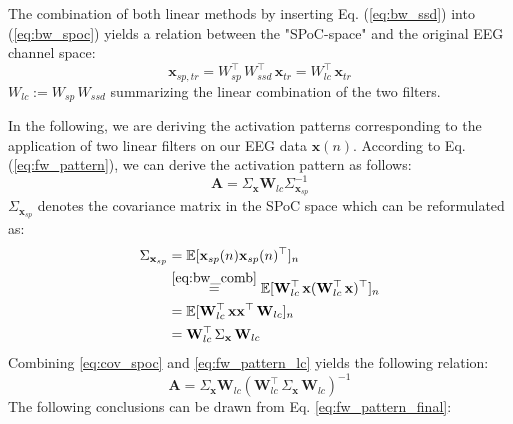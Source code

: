 \documentclass[11pt,a4paper]{article}
\renewcommand{\vec}[1]{\mathbf{#1}}
\begin{document}
The combination of both linear methods by inserting Eq. (\ref{eq:bw_ssd}) into (\ref{eq:bw_spoc}) yields a relation between the "SPoC-space" and the original EEG channel space:
\begin{equation}\label{eq:bw_comb}
\vec{x}_{sp,tr} = W_{sp}^\top \, W_{ssd}^\top \, \vec{x}_{tr} = W_{lc}^\top\, \vec{x}_{tr}
\end{equation}
$W_{lc} := W_{sp} \, W_{ssd}$ summarizing the linear combination of the two filters. 

In the following, we are deriving the activation patterns corresponding to the application of two linear filters on our EEG data $\vec{x}(n)$. According to Eq.\,(\ref{eq:fw_pattern}), we can derive the activation pattern as follows:
\begin{equation}\label{eq:fw_pattern_lc}
\vec{A} = \Sigma_{\vec{x}} \vec{W}_{lc} \Sigma_{\vec{x}_{sp}}^{-1} 
\end{equation}
$\Sigma_{\vec{x}_{sp}}$ denotes the covariance matrix in the SPoC space which can be reformulated as:
\begin{equation}\label{eq:cov_spoc}
\begin{split}
\Sigma_{\vec{x}_{sp}} & = \mathbb{E}[\vec{x}_{sp}(n) \vec{x}_{sp}(n)^\top]_{n} \\
                      & \overset{\eqref{eq:bw_comb}}{=} \mathbb{E}[\vec{W}_{lc}^\top\, \vec{x} (\vec{W}_{lc}^\top\, \vec{x})^\top]_{n} \\
                      & =\mathbb{E}[\vec{W}_{lc}^\top\, \vec{x} \vec{x}^\top \, \vec{W}_{lc}]_{n} \\
                      & = \vec{W}_{lc}^\top \, \Sigma_{\vec{x}} \, \vec{W}_{lc}
\end{split}
\end{equation}
Combining \eqref{eq:cov_spoc} and \eqref{eq:fw_pattern_lc} yields the following relation:
\begin{equation}\label{eq:fw_pattern_final}
\vec{A} = \Sigma_{\vec{x}} \vec{W}_{lc} (\vec{W}_{lc}^\top \, \Sigma_{\vec{x}} \, \vec{W}_{lc})^{-1} 
\end{equation}
The following conclusions can be drawn from Eq. \eqref{eq:fw_pattern_final}:
\end{document}
